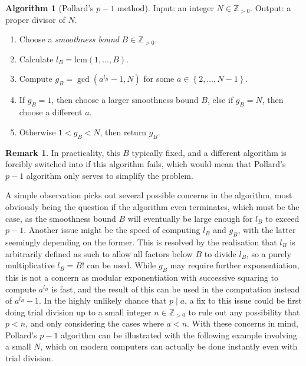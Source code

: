 \documentclass{article}
\newcommand{\Z}{\mathbb{Z}}
\newcommand{\rb}[1]{\left( #1 \right)}
\newcommand{\cb}[1]{\left\{ #1 \right\}}
\theoremstyle{definition}
\newtheorem*{remark}{Remark}
\newtheorem{algorithm}[proposition]{Algorithm}
\begin{document}
\begin{algorithm}[Pollard's $ p - 1 $ method]
Input: an integer $ N \in \Z_{> 0} $. Output: a proper divisor of $ N $.
\begin{enumerate}
\item Choose a \emph{smoothness bound} $ B \in \Z_{> 0} $.
\item Calculate $ l_B = \text{lcm}\rb{1, \dots, B} $.
\item Compute $ g_B = \gcd\rb{a^{l_B} - 1, N} $ for some $ a \in \cb{2, \dots, N - 1} $.
\item If $ g_B = 1 $, then choose a larger smoothness bound $ B $, else if $ g_B = N $, then choose a different $ a $.
\item Otherwise $ 1 < g_B < N $, then return $ g_B $.
\end{enumerate}
\end{algorithm}

\pagebreak

\begin{remark}
In practicality, this $ B $ typically fixed, and a different algorithm is forcibly switched into if this algorithm fails, which would mean that Pollard's $ p - 1 $ algorithm only serves to simplify the problem.
\end{remark}

A simple observation picks out several possible concerns in the algorithm, most obviously being the question if the algorithm even terminates, which must be the case, as the smoothness bound $ B $ will eventually be large enough for $ l_B $ to exceed $ p - 1 $. Another issue might be the speed of computing $ l_B $ and $ g_B $, with the latter seemingly depending on the former. This is resolved by the realisation that $ l_B $ is arbitrarily defined as such to allow all factors below $ B $ to divide $ l_B $, so a purely multiplicative $ l_B = B! $ can be used. While $ g_B $ may require further exponentiation, this is not a concern as modular exponentiation with successive squaring to compute $ a^{l_B} $ is fast, and the result of this can be used in the computation instead of $ a^{l_B} - 1 $. In the highly unlikely chance that $ p \mid a $, a fix to this issue could be first doing trial division up to a small integer $ n \in \Z_{> 0} $ to rule out any possibility that $ p < n $, and only considering the cases where $ a < n $. With these concerns in mind, Pollard's $ p - 1 $ algorithm can be illustrated with the following example involving a small $ N $, which on modern computers can actually be done instantly even with trial division.
\end{document}
